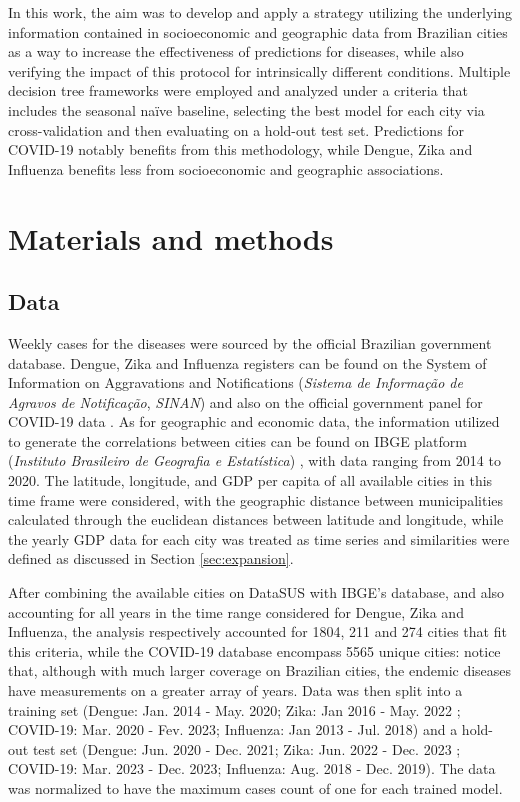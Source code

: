 In this work, the aim was to develop and apply a strategy utilizing the underlying information contained in socioeconomic and geographic data from Brazilian cities as a way to increase the effectiveness of predictions for diseases, while also verifying the impact of this protocol for intrinsically different conditions. Multiple decision tree frameworks were employed and analyzed under a criteria that includes the seasonal naïve baseline, selecting the best model for each city via cross-validation and then evaluating on a hold-out test set. Predictions for COVID-19 notably benefits from this methodology, while Dengue, Zika and Influenza benefits less from socioeconomic and geographic associations.


\section{Materials and methods}

\subsection{\label{sec:data} Data}

Weekly cases for the diseases were sourced by the official Brazilian government database. Dengue, Zika and Influenza registers can be found on the System of Information on Aggravations and Notifications (\textit{Sistema de Informação de Agravos de Notificação}, \textit{SINAN}) \cite{Datasus_site} and also on the official government panel for COVID-19 data \cite{Covid_weekly_data}. As for geographic and economic data, the information utilized to generate the correlations between cities can be found on IBGE platform (\textit{Instituto Brasileiro de Geografia e Estatística}) \cite{IBGE_site}, with data ranging from 2014 to 2020. The latitude, longitude, and GDP per capita of all available cities in this time frame were considered, with the geographic distance between municipalities calculated through the euclidean distances between latitude and longitude, while the yearly GDP data for each city was treated as time series and similarities were defined as discussed in Section \ref{sec:expansion}.

After combining the available cities on DataSUS with IBGE's database, and also accounting for all years in the time range considered for Dengue, Zika and Influenza, the analysis respectively accounted for 1804, 211 and 274 cities that fit this criteria, while the COVID-19 database encompass 5565 unique cities: notice that, although with much larger coverage on Brazilian cities, the endemic diseases have measurements on a greater array of years. Data was then split into a training set (Dengue: Jan. 2014 - May. 2020; Zika: Jan 2016 - May. 2022 ; COVID-19: Mar. 2020 - Fev. 2023; Influenza: Jan 2013 - Jul. 2018) and a hold-out test set (Dengue: Jun. 2020 - Dec. 2021; Zika: Jun. 2022 - Dec. 2023 ; COVID-19: Mar. 2023 - Dec. 2023; Influenza: Aug. 2018 - Dec. 2019). The data was normalized to have the maximum cases count of one for each trained model. 

